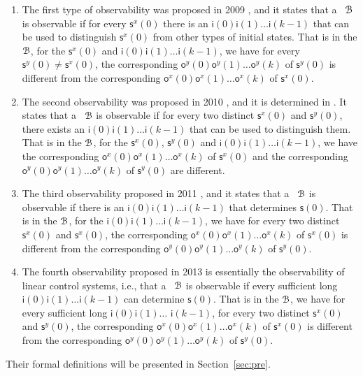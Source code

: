 \begin{enumerate}
	\item The first type of observability was proposed in 2009 \cite{cheng2009controllability}, and it states that a \BCN\ ${\mathcal{B}}$ is observable if for every $\mathsf{s}^{x}(0)$ there is an $\mathsf{i}(0)\mathsf{i}(1)\ldots\mathsf{i}(k-1)$ that can be used to distinguish $\mathsf{s}^{x}(0)$ from other types of initial states. That is in the ${\mathcal{B}}$, for the $\mathsf{s}^{x}(0)$ and $\mathsf{i}(0)$$\mathsf{i}(1)\ldots$$\mathsf{i}(k-1)$, we have for every $\mathsf{s}^{y}(0)\ne\mathsf{s}^{x}(0)$, the corresponding $\mathsf{o}^{y}(0)$$\mathsf{o}^{y}(1)\ldots$$\mathsf{o}^{y}(k)$ of $\mathsf{s}^{y}(0)$ is different from the corresponding $\mathsf{o}^{x}(0)$$\mathsf{o}^{x}(1)\ldots$$\mathsf{o}^{x}(k)$ of $\mathsf{s}^{x}(0)$. 
	\item 
	The second observability was proposed in 2010 \cite{Zhao2010Input}, and it is determined in \cite{Li2015Controllability}. It states that a \BCN\ ${\mathcal{B}}$ is observable if for every two distinct $\mathsf{s}^{x}(0)$ and $\mathsf{s}^{y}(0)$, there exists an $\mathsf{i}(0)$$\mathsf{i}(1)\ldots$$\mathsf{i}(k-1)$ that can be used to distinguish them. That is in the ${\mathcal{B}}$, for the $\mathsf{s}^{x}(0)$, $\mathsf{s}^{y}(0)$ and $\mathsf{i}(0)\mathsf{i}(1)\ldots\mathsf{i}(k-1)$, we have the corresponding $\mathsf{o}^{x}(0)\mathsf{o}^{x}(1)\ldots\mathsf{o}^{x}(k)$ of $\mathsf{s}^{x}(0)$ and the corresponding $\mathsf{o}^{y}(0)\mathsf{o}^{y}(1)\ldots\mathsf{o}^{y}(k)$ of $\mathsf{s}^{y}(0)$ are different.
	\item The third observability proposed in 2011 \cite{Cheng2011Identification}, and it states that a \BCN\ ${\mathcal{B}}$ is observable if there is an $\mathsf{i}(0)$$\mathsf{i}(1)\ldots$$\mathsf{i}(k-1)$ that determines $\mathsf{s}(0)$. That is in the ${\mathcal{B}}$, for the $\mathsf{i}(0)$$\mathsf{i}(1)\ldots$$\mathsf{i}(k-1)$, we have for every two distinct $\mathsf{s}^{x}(0)$ and $\mathsf{s}^{x}(0)$, the corresponding $\mathsf{o}^{x}(0)$$\mathsf{o}^{x}(1)\ldots$$\mathsf{o}^{x}(k)$ of $\mathsf{s}^{x}(0)$ is different from the corresponding $\mathsf{o}^{y}(0)$$\mathsf{o}^{y}(1)\ldots$$\mathsf{o}^{y}(k)$ of $\mathsf{s}^{y}(0)$.
	
	\item  The fourth observability proposed in 2013 \cite{Fornasini2013Observability} is essentially the observability of linear control systems, i.e., that a \BCN\ ${\mathcal{B}}$ is observable if every sufficient long $\mathsf{i}(0)$$\mathsf{i}(1)\ldots$$\mathsf{i}(k-1)$ can determine $\mathsf{s}(0)$. That is in the ${\mathcal{B}}$, we have for every sufficient long $\mathsf{i}(0)$$\mathsf{i}(1)\ldots$ $\mathsf{i}(k-1)$, for every two distinct $\mathsf{s}^{x}(0)$ and $\mathsf{s}^{y}(0)$, the corresponding $\mathsf{o}^{x}(0)$$\mathsf{o}^{x}(1)\ldots$$\mathsf{o}^{x}(k)$ of $\mathsf{s}^{x}(0)$ is different from the corresponding $\mathsf{o}^{y}(0)$$\mathsf{o}^{y}(1)\ldots$$\mathsf{o}^{y}(k)$ of $\mathsf{s}^{y}(0)$.
\end{enumerate}
 Their formal definitions will be presented in Section~\ref{sec:pre}.

